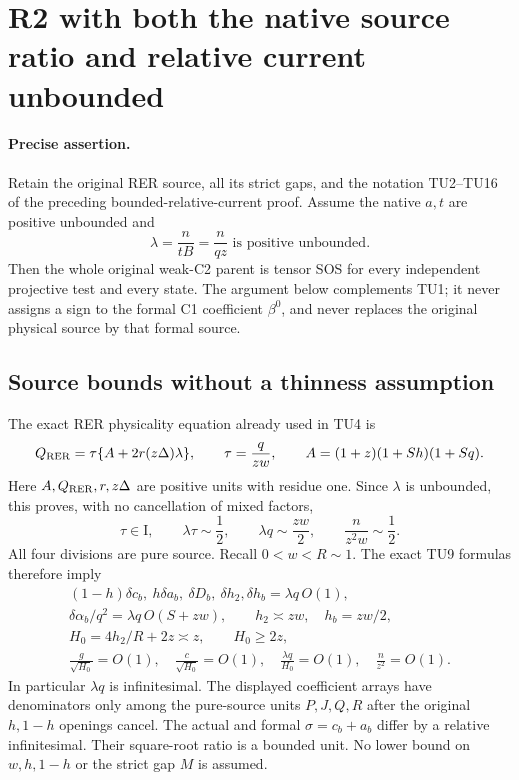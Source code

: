 \section{R2 with both the native source ratio and relative current unbounded}
\label{sec:r2-unbounded-current-new}

\paragraph{Precise assertion.}
Retain the original RER source, all its strict gaps, and the notation
TU2--TU16 of the preceding bounded-relative-current proof.
Assume the native $a,t$ are positive unbounded and
\[
             \lambda=\frac{n}{tB}=\frac{n}{qz}
                   \text{ is positive unbounded}.                 \tag{UL1}
\]
Then the whole original weak-C2 parent is tensor SOS for every
independent projective test and every state. The argument below
complements TU1; it never assigns a sign to the formal C1 coefficient
$\beta^0$, and never replaces the original physical source by that
formal source.

\subsection{Source bounds without a thinness assumption}

The exact RER physicality equation already used in TU4 is
\[
 Q_{\rm RER}=\tau\{A+2r(z\Delta)\lambda\},\qquad
 \tau=\frac q{zw},\qquad
 A=(1+z)(1+Sh)(1+Sq).
\]
Here $A,Q_{\rm RER},r,z\Delta$ are positive units with residue one.
Since $\lambda$ is unbounded, this proves, with no cancellation of
mixed factors,
\[
 \tau\in\mathrm I,\qquad \lambda\tau\sim\frac12,\qquad
 \lambda q\sim\frac{zw}{2},\qquad
 \frac n{z^2w}\sim\frac12.                                     \tag{UL2}
\]
All four divisions are pure source. Recall $0<w<R\sim1$.
The exact TU9 formulas therefore imply
\[
\begin{gathered}
 (1-h)\delta c_b,\ h\delta a_b,\ \delta D_b,\
            \delta h_2,\delta h_b=\lambda q\,O(1),\\
 \delta\alpha_b/q^2=\lambda q\,O(S+zw),\qquad
 h_2\asymp zw,\quad h_b=zw/2,\\
 H_0=4h_2/R+2z\asymp z,\qquad H_0\geq2z,\\
 \frac g{\sqrt{H_0}}=O(1),\quad
 \frac c{\sqrt{H_0}}=O(1),\quad
 \frac{\lambda q}{H_0}=O(1),\quad \frac n{z^2}=O(1).
\end{gathered}                                                   \tag{UL3}
\]
In particular $\lambda q$ is infinitesimal. The displayed coefficient
arrays have denominators only among the pure-source units
$P,J,Q,R$ after the original $h,1-h$ openings cancel.
The actual and formal $\sigma=c_b+a_b$ differ by a relative
infinitesimal. Their square-root ratio is a bounded unit.
No lower bound on $w,h,1-h$ or the strict gap $M$ is assumed.


